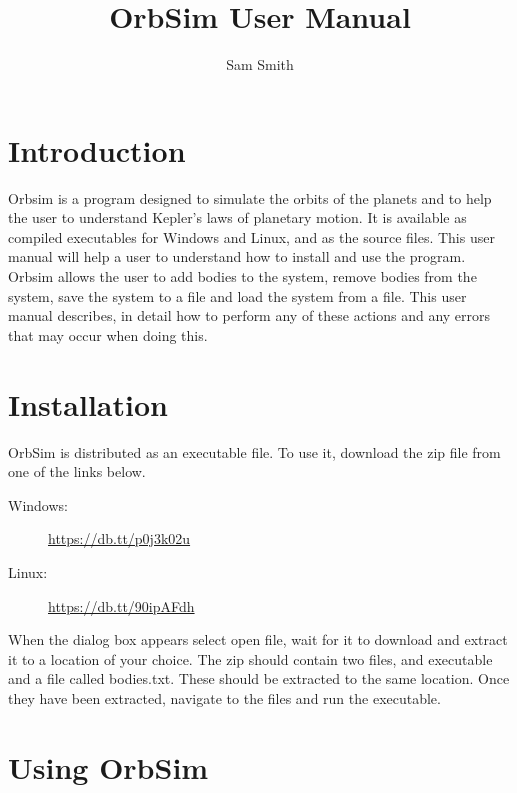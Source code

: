\documentclass[a4paper,11pt,titlepage]{article}
\author{Sam Smith}
\title{OrbSim User Manual}
\date{}
\begin{document}
\maketitle
\tableofcontents
\clearpage

\section{Introduction}
Orbsim is a program designed to simulate the orbits of the planets and to help
the user to understand Kepler's laws of planetary motion. It is available as
compiled executables for Windows and Linux, and as the source files. This user
manual will help a user to understand how to install and use the program. \\

Orbsim allows the user to add bodies to the system, remove bodies from the
system, save the system to a file and load the system from a file. This user
manual describes, in detail how to perform any of these actions and any errors
that may occur when doing this.

\section{Installation}
OrbSim is distributed as an executable file. To use it, download the zip file
from one of the links below. 

\begin{description}
	\item[Windows:] \url{https://db.tt/p0j3k02u}
	\item[Linux:] \url{https://db.tt/90ipAFdh}
\end{description}

When the dialog box appears select open file, wait for it to download and
extract it to a location of your choice. The zip should contain two files, and
executable and a file called bodies.txt. These should be extracted to the same
location. Once they have been extracted, navigate to the files and run the
executable.

\section{Using OrbSim}
\end{document}
